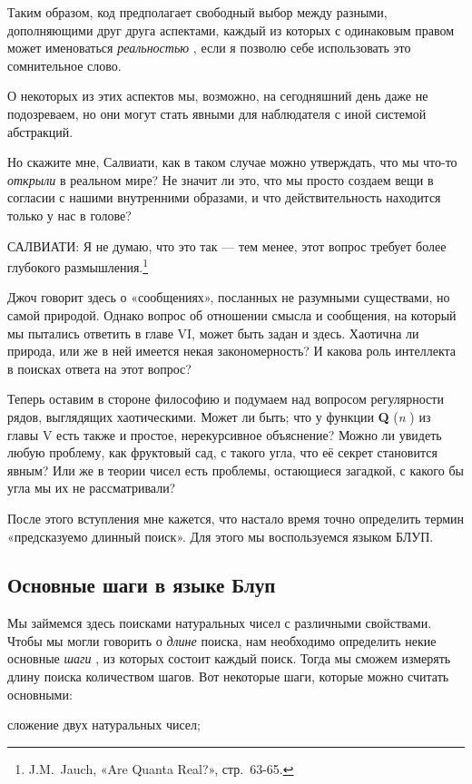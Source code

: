 \documentclass[../main.tex]{subfiles}
\begin{document}
Таким образом, код предполагает свободный выбор между разными, дополняющими друг друга аспектами, каждый из которых с одинаковым правом может именоваться \emph{реальностью} , если я позволю себе использовать это сомнительное слово.

О некоторых из этих аспектов мы, возможно, на сегодняшний день даже не подозреваем, но они могут стать явными для наблюдателя с иной системой абстракций.

Но скажите мне, Салвиати, как в таком случае можно утверждать, что мы что-то \emph{открыли} в реальном мире? Не значит ли это, что мы просто создаем вещи в согласии с нашими внутренними образами, и что действительность находится только у нас в голове?

САЛВИАТИ: Я не думаю, что это так --- тем менее, этот вопрос требует более глубокого размышления.\footnote{J.M.~Jauch, «Are Quanta Real?», стр.~63-65.}

Джоч говорит здесь о «сообщениях», посланных не разумными существами, но самой природой. Однако вопрос об отношении смысла и сообщения, на который мы пытались ответить в главе VI, может быть задан и здесь. Хаотична ли природа, или же в ней имеется некая закономерность? И какова роль интеллекта в поисках ответа на этот вопрос?

Теперь оставим в стороне философию и подумаем над вопросом регулярности рядов, выглядящих хаотическими. Может ли быть; что у функции \textbf{Q} (\emph{n} ) из главы V есть также и простое, нерекурсивное объяснение? Можно ли увидеть любую проблему, как фруктовый сад, с такого угла, что её секрет становится явным? Или же в теории чисел есть проблемы, остающиеся загадкой, с какого бы угла мы их не рассматривали?

После этого вступления мне кажется, что настало время точно определить термин «предсказуемо длинный поиск». Для этого мы воспользуемся языком БЛУП.


\subsection{Основные шаги в языке Блуп}

Мы займемся здесь поисками натуральных чисел с различными свойствами. Чтобы мы могли говорить о \emph{длине} поиска, нам необходимо определить некие основные \emph{шаги} , из которых состоит каждый поиск. Тогда мы сможем измерять длину поиска количеством шагов. Вот некоторые шаги, которые можно считать основными:

сложение двух натуральных чисел;
\end{document}
